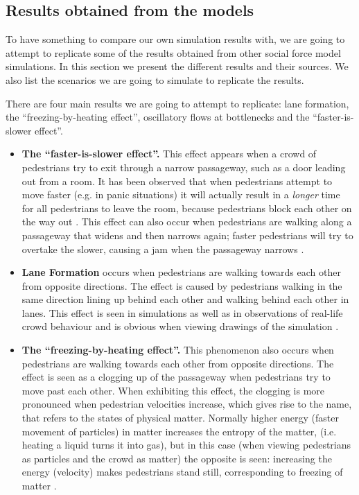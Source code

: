 \subsection{Results obtained from the models}
To have something to compare our own simulation results with, we are going to 
attempt to replicate some of the results obtained from other social force 
model simulations. In this section we present the different results and their 
sources. We also list the scenarios we are going to simulate to replicate the 
results.

There are four main results we are going to attempt to replicate: lane 
formation, the ``freezing-by-heating effect'', oscillatory flows at 
bottlenecks and the ``faster-is-slower effect''.

\begin{itemize}
    \item \textbf{The ``faster-is-slower effect''.}  This effect appears when 
        a crowd of pedestrians try to exit through a narrow passageway, such 
        as a door leading out from a room. It has been observed that when 
        pedestrians attempt to move faster (e.g. in panic situations) it will 
        actually result in a \emph{longer} time for all pedestrians to leave 
        the room, because pedestrians block each other on the way out 
        \cite{helbing00}. This effect can also occur when pedestrians are 
        walking along a passageway that widens and then narrows again; faster 
        pedestrians will try to overtake the slower, causing a jam when the 
        passageway narrows \cite{self-org}.

    \item \textbf{Lane Formation} occurs when pedestrians are walking towards 
        each other from opposite directions. The effect is caused by 
        pedestrians walking in the same direction lining up behind each other 
        and walking behind each other in lanes. This effect is seen in 
        simulations as well as in observations of real-life crowd behaviour 
        and is obvious when viewing drawings of the simulation 
        \cite{self-org}.
        
    \item \textbf{The ``freezing-by-heating effect''.} This phenomenon also 
        occurs when pedestrians are walking towards each other from opposite 
        directions. The effect is seen as a clogging up of the passageway when 
        pedestrians try to move past each other. When exhibiting this effect, 
        the clogging is more pronounced when pedestrian velocities increase, 
        which gives rise to the name, that refers to the states of physical 
        matter. Normally higher energy (faster movement of particles) in 
        matter increases the entropy of the matter, (i.e.  heating a liquid 
        turns it into gas), but in this case (when viewing pedestrians as 
        particles and the crowd as matter) the opposite is seen: increasing 
        the energy (velocity) makes pedestrians stand still, corresponding to 
        freezing of matter \cite{frebyheat}.
        

\end{itemize}
